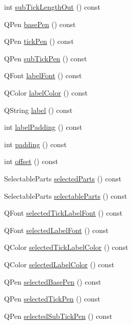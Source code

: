 \begin{DoxyCompactItemize}
int \hyperlink{classQCPAxis_a091fdf8d1b3f9660e38b854578efb9bc}{sub\+Tick\+Length\+Out} () const 
\item 
Q\+Pen \hyperlink{classQCPAxis_a4f6a7cd46fb104b1dad93e29cc78fe74}{base\+Pen} () const 
\item 
Q\+Pen \hyperlink{classQCPAxis_a5eb206da4265c6c083db71d692da3bc4}{tick\+Pen} () const 
\item 
Q\+Pen \hyperlink{classQCPAxis_a2e8bce6dd03e393dbdf6bb427461a726}{sub\+Tick\+Pen} () const 
\item 
Q\+Font \hyperlink{classQCPAxis_ae8029ae0b32e9d4d73dddcdd0a08c838}{label\+Font} () const 
\item 
Q\+Color \hyperlink{classQCPAxis_a7854c2875e3b8d86b210d108bd87aeb9}{label\+Color} () const 
\item 
Q\+String \hyperlink{classQCPAxis_ab3486dca5a6e9e3ca0e32678272ba549}{label} () const 
\item 
int \hyperlink{classQCPAxis_a59c9a0e362dec811491fc9a0709d2afa}{label\+Padding} () const 
\item 
int \hyperlink{classQCPAxis_abb85015a9467ec176e70698307ec833a}{padding} () const 
\item 
int \hyperlink{classQCPAxis_aebc032ac6eea164a02859c017f52d5e7}{offset} () const 
\item 
Selectable\+Parts \hyperlink{classQCPAxis_a08323248a1cba4750ef07ceea159e0b3}{selected\+Parts} () const 
\item 
Selectable\+Parts \hyperlink{classQCPAxis_ad2bff3d2ed3d35c10d44c0c02441bd2c}{selectable\+Parts} () const 
\item 
Q\+Font \hyperlink{classQCPAxis_ae245bb3dcd0ec71eee38437de6e719f7}{selected\+Tick\+Label\+Font} () const 
\item 
Q\+Font \hyperlink{classQCPAxis_a078bbc88b33595a5308350c2889c96d4}{selected\+Label\+Font} () const 
\item 
Q\+Color \hyperlink{classQCPAxis_a5a3af4bd1a820bb7c6d4c85e1d8d452f}{selected\+Tick\+Label\+Color} () const 
\item 
Q\+Color \hyperlink{classQCPAxis_a8cf8de6ac7f1ca617e05412f669ed229}{selected\+Label\+Color} () const 
\item 
Q\+Pen \hyperlink{classQCPAxis_a5a3919ad7b60c2789b04c7e72387cfd6}{selected\+Base\+Pen} () const 
\item 
Q\+Pen \hyperlink{classQCPAxis_a9f86ef82e1d1a908ab4c68cfa5fe4175}{selected\+Tick\+Pen} () const 
\item 
Q\+Pen \hyperlink{classQCPAxis_a1b264fdfef48c22aba36e76de7856784}{selected\+Sub\+Tick\+Pen} () const 

\end{DoxyCompactItemize}
